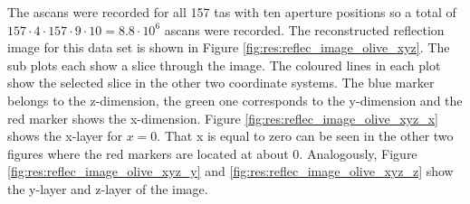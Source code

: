 The \acp{ascan} were recorded for all 157 \ac{tas} with ten aperture positions so a total of $157\cdot4\cdot157\cdot9\cdot10 = 8.8\cdot10^6$ \acp{ascan} were recorded. The reconstructed reflection image for this data set is shown in Figure \ref{fig:res:reflec_image_olive_xyz}. The sub plots each show a slice through the image. The coloured lines in each plot show the selected slice in the other two coordinate systems. The blue marker belongs to the z-dimension, the green one corresponds to the y-dimension and the red marker shows the x-dimension. Figure \ref{fig:res:reflec_image_olive_xyz_x} shows the x-layer for $x = 0$. That x is equal to zero can be seen in the other two figures where the red markers are located at about 0. Analogously, Figure \ref{fig:res:reflec_image_olive_xyz_y} and  \ref{fig:res:reflec_image_olive_xyz_z} show the y-layer and z-layer of the image.

